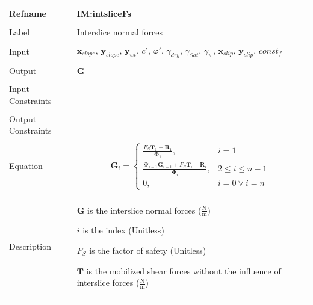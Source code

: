 \documentclass[12pt]{article}
\begin{document}
\noindent \begin{minipage}{\textwidth}
          \begin{tabular}{>{\raggedright}p{}>{\raggedright\arraybackslash}p{}}
          \toprule \textbf{Refname} & \textbf{IM:intsliceFs}
          \label{IM:intsliceFs}
          \\ \midrule \\
          Label & Interslice normal forces
          \\ \midrule \\
          Input & ${\mathbf{x}_{slope}}$, ${\mathbf{y}_{slope}}$, ${\mathbf{y}_{wt}}$, $c'$, $φ'$, ${γ_{dry}}$, ${γ_{Sat}}$, ${γ_{w}}$, ${\mathbf{x}_{slip}}$, ${\mathbf{y}_{slip}}$, $const_f$
          \\ \midrule \\
          Output & $\mathbf{G}$
          \\ \midrule \\
          Input Constraints & 
          \\ \midrule \\
          Output Constraints & 
          \\ \midrule \\
          Equation & \begin{displaymath}
                     {\mathbf{G}}_{i}=\begin{cases}
                                      \frac{{F_{S}} {\mathbf{T}}_{1}-{\mathbf{R}}_{1}}{{\mathbf{Φ}}_{1}}, & i=1\\
\frac{{\mathbf{Ψ}}_{i-1} {\mathbf{G}}_{i-1}+{F_{S}} {\mathbf{T}}_{i}-{\mathbf{R}}_{i}}{{\mathbf{Φ}}_{i}}, & 2\leq{}i\leq{}n-1\\
0, & i=0\lor{}i=n
                                      \end{cases}
                     \end{displaymath}
          \\ \midrule \\
          Description & \begin{symbDescription}
                        \item{$\mathbf{G}$ is the interslice normal forces ($\frac{\text{N}}{\text{m}}$)}
                        \item{$i$ is the index (Unitless)}
                        \item{${F_{S}}$ is the factor of safety (Unitless)}
                        \item{$\mathbf{T}$ is the mobilized shear forces without the influence of interslice forces ($\frac{\text{N}}{\text{m}}$)}

\end{symbDescription}
\end{tabular}
\end{minipage}
\end{document}
